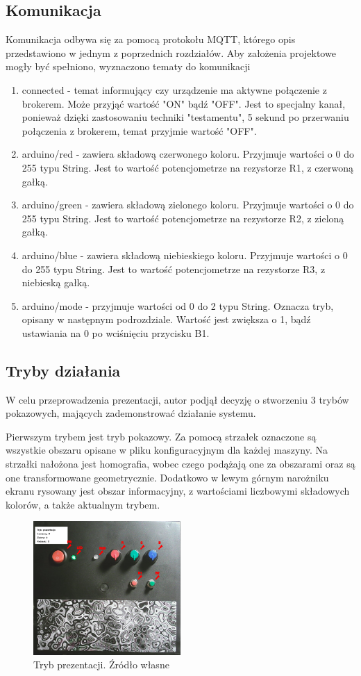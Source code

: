 \documentclass[12pt,twoside,polish]{article}
\begin{document}
\subsection{Komunikacja}
Komunikacja odbywa się za pomocą protokołu MQTT, którego opis przedstawiono w jednym z poprzednich rozdziałów. Aby założenia projektowe mogły być spełniono, wyznaczono tematy do komunikacji
\begin{enumerate}
	\item connected - temat informujący czy urządzenie ma aktywne połączenie z brokerem. Może przyjąć wartość "ON" bądź "OFF". Jest to specjalny kanał, ponieważ dzięki zastosowaniu techniki "testamentu", 5 sekund po przerwaniu połączenia z brokerem, temat przyjmie wartość "OFF".
	\item arduino/red - zawiera składową czerwonego koloru. Przyjmuje wartości o 0 do 255 typu String. Jest to wartość potencjometrze na rezystorze R1, z czerwoną gałką.
	\item arduino/green - zawiera składową zielonego koloru. Przyjmuje wartości o 0 do 255 typu String. Jest to wartość potencjometrze na rezystorze R2, z zieloną gałką.
	\item arduino/blue - zawiera składową niebieskiego koloru. Przyjmuje wartości o 0 do 255 typu String. Jest to wartość potencjometrze na rezystorze R3, z niebieską gałką.
	\item arduino/mode - przyjmuje wartości od 0 do 2 typu String. Oznacza tryb, opisany w następnym podrozdziale. Wartość jest zwiększa o 1, bądź ustawiania na 0 po wciśnięciu przycisku B1.
\end{enumerate}

\subsection{Tryby działania}
W celu przeprowadzenia prezentacji, autor podjął decyzję o stworzeniu 3 trybów pokazowych, mających zademonstrować działanie systemu.

Pierwszym trybem jest tryb pokazowy. Za pomocą strzałek oznaczone są wszystkie obszaru opisane w pliku konfiguracyjnym dla każdej maszyny. Na strzałki nałożona jest homografia, wobec czego podążają one za obszarami oraz są one transformowane geometrycznie. Dodatkowo w lewym górnym narożniku ekranu rysowany jest obszar informacyjny, z wartościami liczbowymi składowych kolorów, a także aktualnym trybem.


\begin{figure}[h]
	\centering
	\includegraphics[width=0.5\textwidth]{pres}
	\caption{Tryb prezentacji. Źródło własne}
\end{figure}
\end{document}
